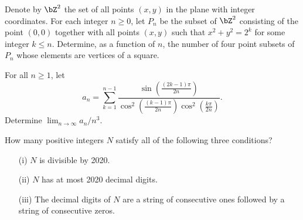 \documentclass[12pt]{article}
\begin{document}
    \begin{exercise}[2019 B1]
        Denote by \(\bZ^2\) the set of all points \((x,y)\) in the plane with integer coordinates.
        For each integer \(n\geq 0\), let \(P_n\) be the subset of \(\bZ^2\) consisting of the point \((0,0)\) together with all points \((x,y)\) such that \(x^2+y^2=2^k\) for some integer \(k\leq n\).
        Determine, as a function of \(n\), the number of four point subsets of \(P_n\) whose elements are vertices of a square.
    \end{exercise}
    
    \begin{exercise}[2019 B2]
        For all \(n\geq 1\), let
        \[a_n = \sum_{k=1}^{n-1}\frac{\sin\left(\frac{(2k-1)\pi}{2n}\right)}{\cos^2\left(\frac{(k-1)\pi}{2n}\right)\cos^2\left(\frac{k\pi}{2n}\right)}.\]
        Determine $\lim_{n\to\infty}a_n /n^3$.
    \end{exercise}

    \begin{exercise}[2020 A1]
        How many positive integers \(N\) satisfy all of the following three conditions?
        \begin{enumerate}
            \item[(i)] \(N\) is divisible by 2020.
            \item[(ii)] \(N\) has at most 2020 decimal digits.
            \item[(iii)] The decimal digits of \(N\) are a string of consecutive ones followed by a string of consecutive zeros.
        \end{enumerate}
    \end{exercise}
\end{document}

